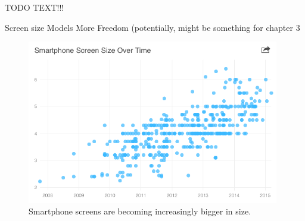 TODO TEXT!!!

Screen size
Models
More Freedom (potentially, might be something for chapter 3
\\
	\begin{figure}[ht!]
		\centering
		\includegraphics[width=110mm]{images/smartphoneSize}
		\caption{Smartphone screens are becoming increasingly bigger in size.\cite{smartphoneSizeChart}}
		\label{smartphoneSizeChart}
	\end{figure}
\\
\hfill








